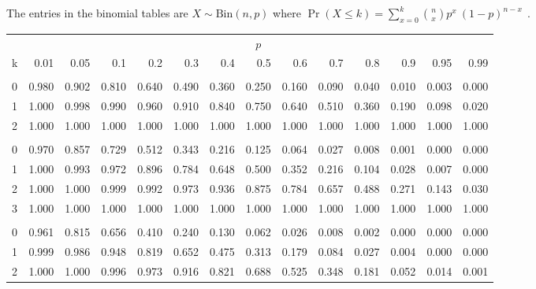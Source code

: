 \documentclass[
]{article}
\begin{document}
The entries in the binomial tables are \(X\sim\text{Bin}(n,p)\) where
\(\Pr(X \leq k)= \sum_{x=0}^{k}\binom{n}{x}p^x\ (1-p)^{n-x} \ \ \).

\begin{longtable}[t]{lrrrrrrrrrrrrr}
\toprule
\multicolumn{1}{c}{ } & \multicolumn{13}{c}{$p$} \\
\cmidrule(l{3pt}r{3pt}){2-14}
k & 0.01 & 0.05 & 0.1 & 0.2 & 0.3 & 0.4 & 0.5 & 0.6 & 0.7 & 0.8 & 0.9 & 0.95 & 0.99\\
\midrule
\addlinespace[0.3em]
\multicolumn{14}{l}{$n=2$}\\
\hspace{1em}0 & 0.980 & 0.902 & 0.810 & 0.640 & 0.490 & 0.360 & 0.250 & 0.160 & 0.090 & 0.040 & 0.010 & 0.003 & 0.000\\
\hspace{1em}1 & 1.000 & 0.998 & 0.990 & 0.960 & 0.910 & 0.840 & 0.750 & 0.640 & 0.510 & 0.360 & 0.190 & 0.098 & 0.020\\
\hspace{1em}2 & 1.000 & 1.000 & 1.000 & 1.000 & 1.000 & 1.000 & 1.000 & 1.000 & 1.000 & 1.000 & 1.000 & 1.000 & 1.000\\
\addlinespace[0.3em]
\multicolumn{14}{l}{$n=3$}\\
\hspace{1em}0 & 0.970 & 0.857 & 0.729 & 0.512 & 0.343 & 0.216 & 0.125 & 0.064 & 0.027 & 0.008 & 0.001 & 0.000 & 0.000\\
\hspace{1em}1 & 1.000 & 0.993 & 0.972 & 0.896 & 0.784 & 0.648 & 0.500 & 0.352 & 0.216 & 0.104 & 0.028 & 0.007 & 0.000\\
\hspace{1em}2 & 1.000 & 1.000 & 0.999 & 0.992 & 0.973 & 0.936 & 0.875 & 0.784 & 0.657 & 0.488 & 0.271 & 0.143 & 0.030\\
\hspace{1em}3 & 1.000 & 1.000 & 1.000 & 1.000 & 1.000 & 1.000 & 1.000 & 1.000 & 1.000 & 1.000 & 1.000 & 1.000 & 1.000\\
\addlinespace[0.3em]
\multicolumn{14}{l}{$n=4$}\\
\hspace{1em}0 & 0.961 & 0.815 & 0.656 & 0.410 & 0.240 & 0.130 & 0.062 & 0.026 & 0.008 & 0.002 & 0.000 & 0.000 & 0.000\\
\hspace{1em}1 & 0.999 & 0.986 & 0.948 & 0.819 & 0.652 & 0.475 & 0.313 & 0.179 & 0.084 & 0.027 & 0.004 & 0.000 & 0.000\\
\hspace{1em}2 & 1.000 & 1.000 & 0.996 & 0.973 & 0.916 & 0.821 & 0.688 & 0.525 & 0.348 & 0.181 & 0.052 & 0.014 & 0.001\\

\end{longtable}
\end{document}
